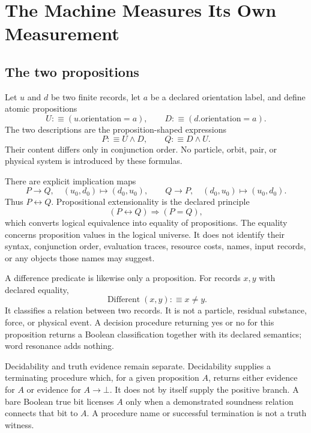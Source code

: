 \chapter{The Machine Measures Its Own Measurement}

\section{The two propositions}

Let \(u\) and \(d\) be two finite records, let \(a\) be a declared orientation label, and define atomic propositions
\[
                         U:\equiv(u.\mathrm{orientation}=a),\qquad
                         D:\equiv(d.\mathrm{orientation}=a).
\]
The two descriptions are the proposition-shaped expressions
\[
                         P:\equiv U\land D,\qquad
                         Q:\equiv D\land U.
\]
Their content differs only in conjunction order.  No particle, orbit, pair, or physical system is introduced by these
formulas.

There are explicit implication maps
\[
                         P\to Q,\quad (u_0,d_0)\mapsto(d_0,u_0),
\qquad
                         Q\to P,\quad (d_0,u_0)\mapsto(u_0,d_0).
\]
Thus \(P\leftrightarrow Q\).  Propositional extensionality is the declared principle
\[
                         (P\leftrightarrow Q)\Longrightarrow(P=Q),
\]
which converts logical equivalence into equality of propositions.  The equality concerns proposition values in the
logical universe.  It does not identify their syntax, conjunction order, evaluation traces, resource costs, names,
input records, or any objects those names may suggest.

A difference predicate is likewise only a proposition.  For records \(x,y\) with declared equality,
\[
                         \operatorname{Different}(x,y):\equiv x\ne y.
\]
It classifies a relation between two records.  It is not a particle, residual substance, force, or physical event.
A decision procedure returning yes or no for this proposition returns a Boolean classification together with its
declared semantics; word resonance adds nothing.

Decidability and truth evidence remain separate.  Decidability supplies a terminating procedure which, for a given
proposition \(A\), returns either evidence for \(A\) or evidence for \(A\to\bot\).  It does not by itself supply the
positive branch.  A bare Boolean true bit licenses \(A\) only when a demonstrated soundness relation connects that
bit to \(A\).  A procedure name or successful termination is not a truth witness.

